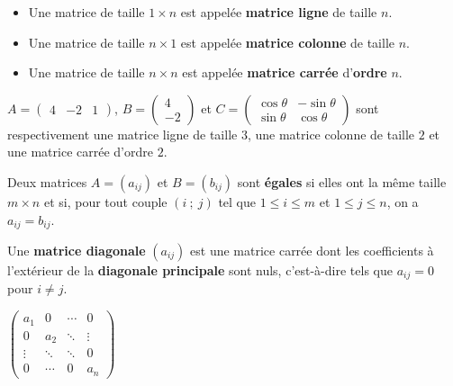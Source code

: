 \documentclass{cornouaille}
\begin{document}
\begin{definition}
\begin{itemize}
\item Une matrice de taille $1\times n$ est appelée \textbf{matrice ligne} de taille $n$.
\item Une matrice  de taille $n\times 1$ est appelée \textbf{matrice colonne} de taille $n$.
\item Une matrice de taille $n\times n$ est appelée \textbf{matrice carrée} d'\textbf{ordre} $n$.
\end{itemize}
\end{definition}

\begin{exemple}
$A=\begin{pmatrix}
4 & -2 & 1
\end{pmatrix}$, $B=\begin{pmatrix}
4 \\ -2
\end{pmatrix}$ et $C=\begin{pmatrix}
\cos \theta & -\sin \theta \\
\sin \theta & \cos \theta
\end{pmatrix}$ sont respectivement une matrice ligne de taille $3$, une matrice colonne de taille $2$ et une matrice carrée d'ordre $2$.
\end{exemple}


\begin{definition}
Deux matrices $A=(a_{ij})$  et $B=(b_{ij})$  sont \textbf{égales} si elles ont la même taille $m\times n$ et si,
 pour tout couple $(i~;~j)$ tel que $1\leqslant i \leqslant m$ et $1\leqslant j \leqslant n$, on a $a_{ij}=b_{ij}$.
\end{definition}


\begin{definition}
Une \textbf{matrice diagonale} $(a_{ij})$ est une matrice carrée dont les coefficients à l'extérieur
de la \textbf{diagonale principale}  sont nuls, c'est-à-dire tels que $a_{ij}=0$ pour $i\neq j$.
\begin{center}\renewcommand{\arraystretch}{0.7}
$\left(\begin{array}{cccc}
a_1    & 0      & \cdots & 0      \\
0      & a_2    & \ddots & \vdots \\
\vdots & \ddots & \ddots & 0      \\
0      & \cdots & 0      & a_n
\end{array}\right)$
\end{center}
\end{definition}
\end{document}
